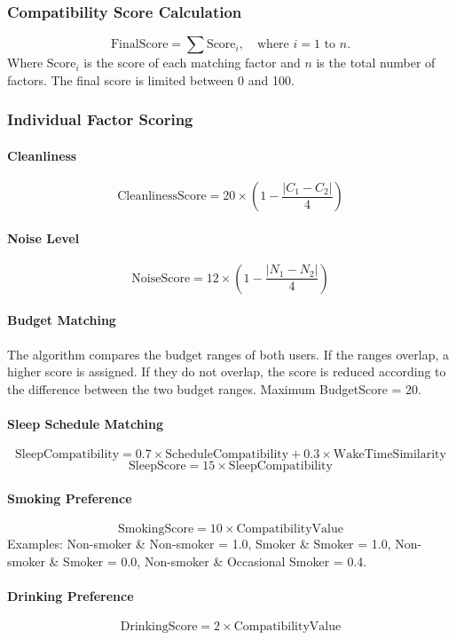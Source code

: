 \subsubsection{Compatibility Score Calculation}
\[
\text{FinalScore} = \sum \text{Score}_i, \quad \text{where } i = 1 \text{ to } n.
\]
Where $\text{Score}_i$ is the score of each matching factor and $n$ is the total number of factors. The final score is limited between 0 and 100.

\subsubsection{Individual Factor Scoring}
\paragraph{Cleanliness}
\[
\text{CleanlinessScore} = 20 \times \left(1 - \frac{|C_1 - C_2|}{4}\right)
\]

\paragraph{Noise Level}
\[
\text{NoiseScore} = 12 \times \left(1 - \frac{|N_1 - N_2|}{4}\right)
\]

\paragraph{Budget Matching}
The algorithm compares the budget ranges of both users. If the ranges overlap, a higher score is assigned. If they do not overlap, the score is reduced according to the difference between the two budget ranges. Maximum BudgetScore = 20.

\paragraph{Sleep Schedule Matching}
\[
\text{SleepCompatibility} = 0.7 \times \text{ScheduleCompatibility} + 0.3 \times \text{WakeTimeSimilarity}
\]
\[
\text{SleepScore} = 15 \times \text{SleepCompatibility}
\]

\paragraph{Smoking Preference}
\[
\text{SmokingScore} = 10 \times \text{CompatibilityValue}
\]
Examples: Non-smoker \& Non-smoker = 1.0, Smoker \& Smoker = 1.0, Non-smoker \& Smoker = 0.0, Non-smoker \& Occasional Smoker = 0.4.

\paragraph{Drinking Preference}
\[
\text{DrinkingScore} = 2 \times \text{CompatibilityValue}
\]

